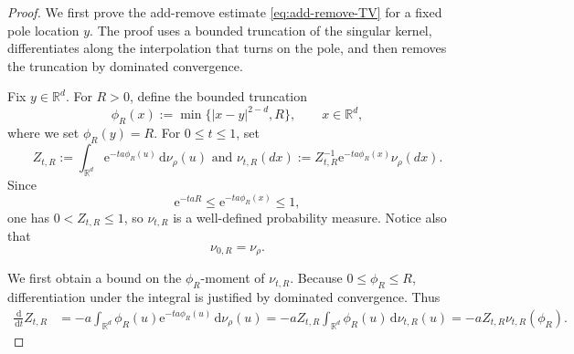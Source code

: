 \documentclass[12pt,reqno,letterpaper]{amsart}
\theoremstyle{definition}
\theoremstyle{remark}
\numberwithin{equation}{section}
\newcommand{\R}{\mathbb R}
\newcommand{\dd}{\,\mathrm d}
\newcommand{\ee}{\mathrm e}
\begin{document}
\begin{proof}
We first prove the add-remove estimate \eqref{eq:add-remove-TV} for a fixed
pole location \(y\).  The proof uses a bounded truncation of the singular
kernel, differentiates along the interpolation that turns on the pole, and
then removes the truncation by dominated convergence.

Fix \(y\in\R^d\).  For \(R>0\), define the bounded truncation
\[
 \phi_R(x):=\min\{|x-y|^{2-d},R\},
 \qquad x\in\R^d,
\]
where we set \(\phi_R(y)=R\).  For \(0\le t\le1\), set
\[
 Z_{t,R}
 :=
 \int_{\R^d}\ee^{-ta\phi_R(u)}\dd\nu_\rho(u) \text{ and }
 \nu_{t,R}(d x)
 :=
 Z_{t,R}^{-1}\ee^{-ta\phi_R(x)}\nu_\rho(d x).
\]
Since
\[
 \ee^{-taR}\le \ee^{-ta\phi_R(x)}\le1,
\]
one has \(0<Z_{t,R}\le1\), so \(\nu_{t,R}\) is a well-defined
probability measure.  Notice also that
\[
 \nu_{0,R}=\nu_\rho.
\]

We first obtain a bound on the \(\phi_R\)-moment of \(\nu_{t,R}\).
Because \(0\le\phi_R\le R\), differentiation under the integral is
justified by dominated convergence.  Thus
\begin{align*}
 \frac{\dd}{\dd t}Z_{t,R}
 &=-a\int_{\R^d}\phi_R(u)\ee^{-ta\phi_R(u)}
   \dd\nu_\rho(u)=-aZ_{t,R}\int_{\R^d}\phi_R(u)\dd\nu_{t,R}(u)
  =-aZ_{t,R}\nu_{t,R}(\phi_R).
\end{align*}


\end{proof}
\end{document}
